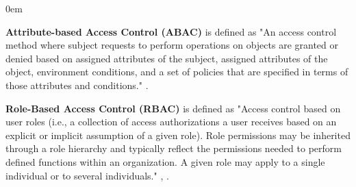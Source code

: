 \begin{description}
	\itemsep0em
	\item \textbf{Attribute-based Access Control (ABAC)} is defined as "An access control method where subject requests to perform	operations on objects are granted or denied based on assigned attributes of the subject, assigned attributes of the object, environment conditions, and a set of policies that are specified in terms of those attributes and conditions." \cite{abac-nist}. %
	\item\textbf{Role-Based Access Control (RBAC)} is defined as "Access control based on user roles (i.e., a collection of access authorizations a user receives based on an explicit or implicit assumption of a given role). Role permissions may be inherited through a role hierarchy and typically reflect the permissions needed to perform defined functions within an organization. A given role may apply to a single individual or to several individuals." \cite{rbac-def-nist-glossary}, \cite{rbac-def-nist}.
	
	
\end{description}